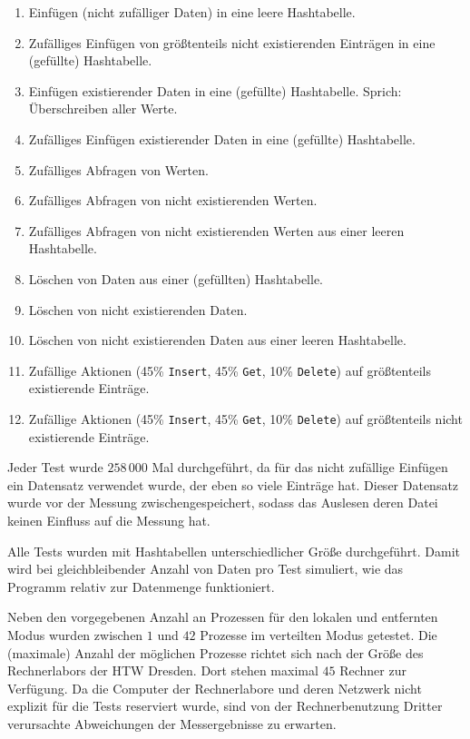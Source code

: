 \documentclass{scrreprt}
\begin{document}
\begin{enumerate}
\item Einfügen (nicht zufälliger Daten) in eine leere Hashtabelle.
\item Zufälliges Einfügen von größtenteils nicht existierenden Einträgen in eine (gefüllte) Hashtabelle.
\item Einfügen existierender Daten in eine (gefüllte) Hashtabelle. Sprich: Überschreiben aller Werte.
\item Zufälliges Einfügen existierender Daten in eine (gefüllte) Hashtabelle.
\item Zufälliges Abfragen von Werten.
\item Zufälliges Abfragen von nicht existierenden Werten.
\item Zufälliges Abfragen von nicht existierenden Werten aus einer leeren Hashtabelle.
\item Löschen von Daten aus einer (gefüllten) Hashtabelle.
\item Löschen von nicht existierenden Daten.
\item Löschen von nicht existierenden Daten aus einer leeren Hashtabelle.
\item Zufällige Aktionen (45\% \lstinline|Insert|, 45\% \lstinline|Get|, 10\% \lstinline|Delete|) auf größtenteils existierende Einträge.
\item Zufällige Aktionen (45\% \lstinline|Insert|, 45\% \lstinline|Get|, 10\% \lstinline|Delete|) auf größtenteils nicht existierende Einträge.
\end{enumerate}

Jeder Test wurde $258\,000$ Mal durchgeführt, da für das nicht zufällige Einfügen ein Datensatz verwendet wurde, der eben so viele Einträge hat. Dieser Datensatz wurde vor der Messung zwischengespeichert, sodass das Auslesen deren Datei keinen Einfluss auf die Messung hat.

Alle Tests wurden mit Hashtabellen unterschiedlicher Größe durchgeführt. Damit wird bei gleichbleibender Anzahl von Daten pro Test simuliert, wie das Programm relativ zur Datenmenge funktioniert.

Neben den vorgegebenen Anzahl an Prozessen für den lokalen und entfernten Modus wurden zwischen $1$ und $42$ Prozesse im verteilten Modus getestet. Die (maximale) Anzahl der möglichen Prozesse richtet sich nach der Größe des Rechnerlabors der HTW Dresden. Dort stehen maximal $45$ Rechner zur Verfügung. Da die Computer der Rechnerlabore und deren Netzwerk nicht explizit für die Tests reserviert wurde, sind von der Rechnerbenutzung Dritter verursachte Abweichungen der Messergebnisse zu erwarten.
\end{document}
